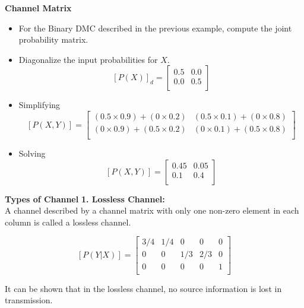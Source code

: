 \documentclass[a4]{beamer}
\begin{document}
\noindent \textbf{Channel Matrix}
\begin{itemize}
\item For the Binary DMC described in the previous example, compute the joint probability matrix.
\item Diagonalize the input probabilities for $X$.
\[  [P(X)]_d  = \left[ \begin{array}{cc}
0.5 & 0.0  \\
0.0 & 0.5\\
\end{array} \right] \]

\item Simplifying
\[  [P(X,Y)]  =  \left[ \begin{array}{cc}
(0.5 \times 0.9)+(0 \times 0.2) & (0.5 \times 0.1)+(0 \times 0.8) \\
(0 \times 0.9)+(0.5 \times 0.2) & (0 \times 0.1)+(0.5 \times 0.8) \\
\end{array} \right]  \]


\item Solving
\[  [P(X,Y)]  =  \left[ \begin{array}{cc}
0.45 & 0.05 \\
0.1  & 0.4 \\
\end{array} \right]  \]
\end{itemize}


\noindent \textbf{Types of Channel}
\textbf{ 1. Lossless Channel:}\\
A channel described by a channel matrix with only one non-zero element in each column is called a lossless channel.


\[  [P(Y|X)]  =  \left[ \begin{array}{ccccc}
3/4 & 1/4 &0 & 0&0\\
0  & 0 &1/3 & 2/3& 0\\
0  & 0& 0&0 &1 \\
\end{array} \right]  \]

It can be shown that in the lossless channel, no source information is lost in transmission.

\end{document}
